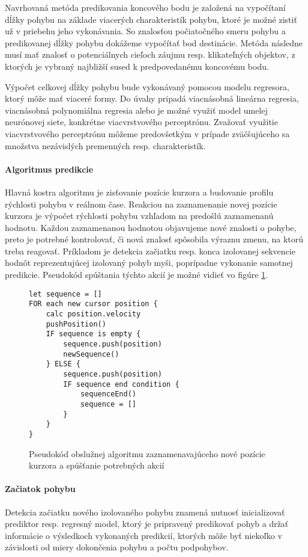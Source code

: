 Navrhovaná metóda predikovania koncového bodu je založená na vypočítaní dĺžky pohybu na základe viacerých charakteristík pohybu, ktoré je možné zistiť už v priebehu jeho vykonávania. So znalosťou počiatočného smeru pohybu a predikovanej dĺžky pohybu dokážeme vypočítať bod destinácie. Metóda následne musí mať znalosť o potenciálnych cieľoch záujmu resp. klikateľných objektov, z ktorých je vybraný najbližší sused k predpovedanému koncovému bodu.

Výpočet celkovej dĺžky pohybu bude vykonávaný pomocou modelu regresora, ktorý môže mať viaceré formy. Do úvahy pripadá viacnásobná lineárna regresia, viacnásobná polynomiálna regresia alebo je možné využiť model umelej neurónovej siete, konkrétne viacvrstvového perceptrónu. Zvažovať využitie viacvrstvového perceptrónu môžeme predovšetkým v prípade zväčšujúceho sa množstva nezávislých premenných resp. charakteristík.

\paragraph*{Algoritmus predikcie}
Hlavná kostra algoritmu je zisťovanie pozície kurzora a budovanie profilu rýchlosti pohybu v reálnom čase. Reakciou na zaznamenanie novej pozície kurzora je výpočet rýchlosti pohybu vzhľadom na predošlú zaznamenanú hodnotu. Každou zaznamenanou hodnotou objavujeme nové znalosti o pohybe, preto je potrebné kontrolovať, či nová znalosť spôsobila výraznu zmenu, na ktorú treba reagovať. Príkladom je detekcia začiatku resp. konca izolovanej sekvencie hodnôt reprezentujúcej izolovaný pohyb myši, poprípadne vykonanie samotnej predikcie. Pseudokód spúštania týchto akcií je možné vidieť vo figúre \ref{code:alg-listener}.

\begin{figure}[h]
\vspace{0.2cm}
\begin{lstlisting}
let sequence = []
FOR each new cursor position {
    calc position.velocity
    pushPosition()
    IF sequence is empty {
        sequence.push(position)
        newSequence()
    } ELSE {
        sequence.push(position)
        IF sequence end condition {
            sequenceEnd()
            sequence = []
        }
    }
}
\end{lstlisting}
\caption{Pseudokód obslužnej algoritmu zaznamenavajúceho nové pozície kurzora a spúšťanie potrebných akcií \label{code:alg-listener}}
\end{figure}

\paragraph{Začiatok pohybu} Detekcia začiatku nového izolovaného pohybu znamená nutnosť inicializovať prediktor resp. regresný model, ktorý je pripravený predikovať pohyb a držať informácie o výsledkoch vykonaných predikcií, ktorých môže byť niekoľko v závislosti od miery dokončenia pohybu a počtu podpohybov.

